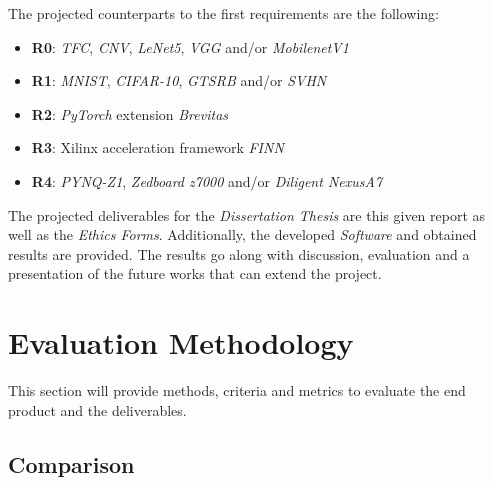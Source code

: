 The projected counterparts to the first requirements are the following:
\begin{itemize}
  \item \textbf{R0}: \emph{TFC}, \emph{CNV}, \emph{LeNet5}, \emph{VGG} and/or \emph{MobilenetV1}
  \item \textbf{R1}: \emph{MNIST}, \emph{CIFAR-10}, \emph{GTSRB} and/or \emph{SVHN}
  \item \textbf{R2}: \emph{PyTorch} extension \emph{Brevitas}
  \item \textbf{R3}: Xilinx acceleration framework \emph{FINN}
  \item \textbf{R4}: \emph{PYNQ-Z1}, \emph{Zedboard z7000} and/or \emph{Diligent NexusA7}
\end{itemize}

The projected deliverables for the \emph{Dissertation Thesis} are this given report as well as the \emph{Ethics Forms}. Additionally, the developed \emph{Software} and obtained results are provided. The results go along with discussion, evaluation and a presentation of the future works that can extend the project.


\section{Evaluation Methodology}

This section will provide methods, criteria and metrics to evaluate the end product and the deliverables.


\subsection{Comparison}

